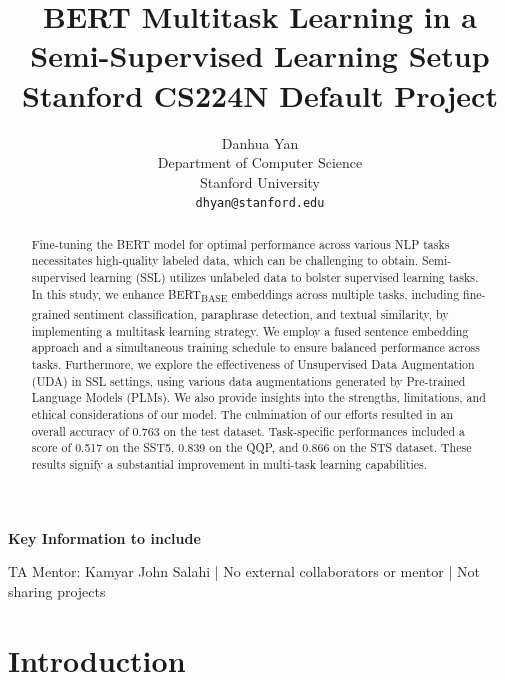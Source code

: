 \documentclass{article}
\title{
  BERT Multitask Learning in a Semi-Supervised Learning Setup \\
  \vspace{1em}
  \small{\normalfont Stanford CS224N Default Project}  %
}
\author{
  Danhua Yan \\
  Department of Computer Science \\
  Stanford University \\
  \texttt{dhyan@stanford.edu} \\
}
\begin{document}
\maketitle

\begin{abstract}
Fine-tuning the BERT model for optimal performance across various NLP tasks necessitates 
high-quality labeled data, which can be challenging to obtain. Semi-supervised learning (SSL) 
utilizes unlabeled data to bolster supervised learning tasks. In this study, we enhance 
BERT\textsubscript{BASE} embeddings across multiple tasks, including fine-grained sentiment 
classification, paraphrase detection, and textual similarity, by implementing a multitask 
learning strategy. We employ a fused sentence embedding approach and a simultaneous training 
schedule to ensure balanced performance across tasks. Furthermore, we explore the effectiveness 
of Unsupervised Data Augmentation (UDA) in SSL settings, using various data augmentations 
generated by Pre-trained Language Models (PLMs). 
We also provide 
insights into the strengths, limitations, and ethical considerations of our model.
The culmination of our efforts resulted in an overall accuracy of 0.763 on the test dataset. 
Task-specific performances included a score of 0.517 on the SST5, 0.839 on the QQP, and 0.866 
on the STS dataset. These results signify a substantial improvement in multi-task learning 
capabilities.

\end{abstract}


\textbf{Key Information to include}

TA Mentor: Kamyar John Salahi | No external collaborators or mentor | Not sharing projects


\section{Introduction}
\end{document}
